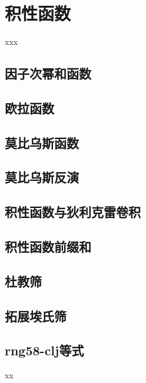 \chapter{积性函数}

\begin{introduction}
	\item xxx
\end{introduction}


\section{因子次幂和函数}


\section{欧拉函数}


\section{莫比乌斯函数}


\section{莫比乌斯反演}


\section{积性函数与狄利克雷卷积}


\section{积性函数前缀和}


\section{杜教筛}


\section{拓展埃氏筛}


\section{rng58-clj等式}


\begin{problemset}
	\item xx
\end{problemset}